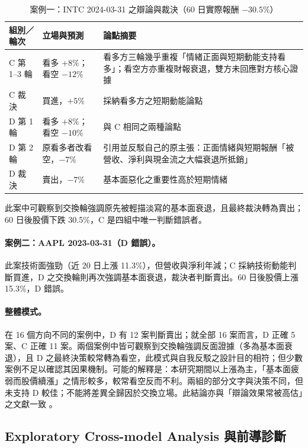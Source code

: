 \documentclass[12pt,a4paper]{article}
\newcommand{\grp}[1]{\textsf{#1}}
\begin{document}
\begin{CJK}{UTF8}{bkai}
\begin{table}[H]
\centering\small
\caption{案例一：INTC 2024-03-31 之辯論與裁決（60 日實際報酬 $-30.5\%$）}
\label{tab:case}
\begin{tabularx}{\textwidth}{@{}l l Y@{}}
\toprule
組別／輪次 & 立場與預測 & 論點摘要 \\
\midrule
\grp{C} 第 1--3 輪 & 看多 $+8\%$；看空 $-12\%$ & 看多方三輪幾乎重複「情緒正面與短期動能支持看多」；看空方亦重複財報衰退，雙方未回應對方核心證據 \\
\grp{C} 裁決 & 買進，$+5\%$ & 採納看多方之短期動能論點 \\
\midrule
\grp{D} 第 1 輪 & 看多 $+8\%$；看空 $-10\%$ & 與 \grp{C} 相同之兩種論點 \\
\grp{D} 第 2 輪 & 原看多者改看空，$-7\%$ & 引用並反駁自己的原主張：正面情緒與短期報酬「被營收、淨利與現金流之大幅衰退所抵銷」 \\
\grp{D} 裁決 & 賣出，$-7\%$ & 基本面惡化之重要性高於短期情緒 \\
\bottomrule
\end{tabularx}
\end{table}

此案中可觀察到交換輪強調原先被輕描淡寫的基本面衰退，且最終裁決轉為賣出；60 日後股價下跌 30.5\%，\grp{C} 是四組中唯一判斷錯誤者。

\paragraph{案例二：AAPL 2023-03-31（\grp{D} 錯誤）。} 此案技術面強勁（近 20 日上漲 11.3\%），但營收與淨利年減；\grp{C} 採納技術動能判斷買進，\grp{D} 之交換輪則再次強調基本面衰退，裁決者判斷賣出。60 日後股價上漲 15.3\%，\grp{D} 錯誤。

\paragraph{整體模式。} 在 16 個方向不同的案例中，\grp{D} 有 12 案判斷賣出；就全部 16 案而言，D 正確 5 案、C 正確 11 案。兩個案例中皆可觀察到交換輪強調反面證據（多為基本面衰退），且 \grp{D} 之最終決策較常轉為看空，此模式與自我反駁之設計目的相符；但少數案例不足以確認其因果機制。可能的解釋是：本研究期間以上漲為主，「基本面疲弱而股價續漲」之情形較多，較常看空反而不利。兩組的部分文字與決策不同，但未支持 D 較佳；不能將差異全歸因於交換立場。此結論亦與「辯論效果常被高估」之文獻一致 \citep{smit2023mad,zhang2025stop}。
\subsection{Exploratory Cross-model Analysis 與前導診斷}


\end{CJK}
\end{document}

